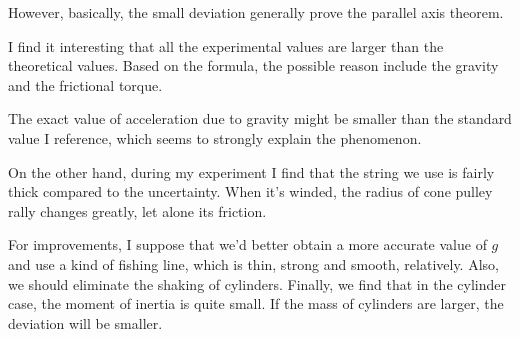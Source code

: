     However, basically, the small deviation generally prove the parallel axis theorem.

    I find it interesting that all the experimental values are larger than the theoretical values. Based on the formula, the possible reason include the gravity and the frictional torque.
    
    The exact value of acceleration due to gravity might be smaller than the standard value I reference, which seems to strongly explain the phenomenon.

    On the other hand, during my experiment I find that the string we use is fairly thick compared to the uncertainty. When it's winded, the radius of cone pulley rally changes greatly, let alone its friction.

    For improvements, I suppose that we'd better obtain a more accurate value of $g$ and use a kind of fishing line, which is thin, strong and smooth, relatively. Also, we should eliminate the shaking of cylinders. Finally, we find that in the cylinder case, the moment of inertia is quite small. If the mass of cylinders are larger, the deviation will be smaller.
